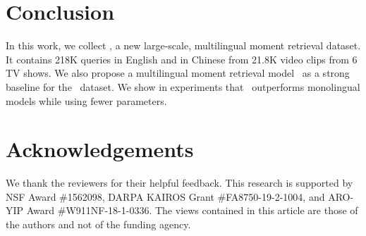 \section{Conclusion}\label{conclusion}
In this work, we collect \DsetName, a new large-scale, multilingual moment retrieval dataset. 
It contains 218K queries in English and in Chinese from 21.8K video clips from 6 TV shows. 
We also propose a multilingual moment retrieval model \ModelName~as a strong baseline for the \DsetName~dataset. 
We show in experiments that \ModelName~outperforms monolingual models while using fewer parameters.


\section*{Acknowledgements}
We thank the reviewers for their helpful feedback. This research is supported by NSF Award \#1562098, DARPA KAIROS Grant \#FA8750-19-2-1004, and ARO-YIP Award \#W911NF-18-1-0336. The views contained in this article are those of the authors and not of the funding agency.
